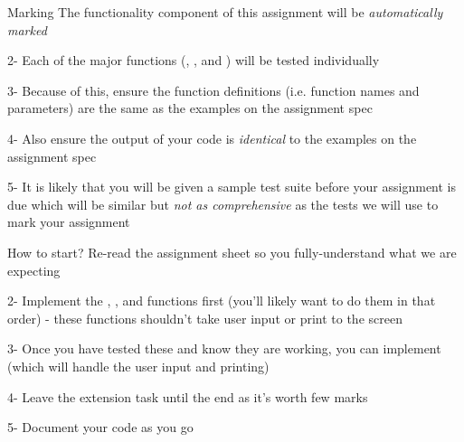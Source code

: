 \documentclass[week3]{csse1001}
\begin{document}
\begin{topic}{Marking}
The functionality component of this assignment will be \textit{automatically marked}

\begin{subtopic}{2-}
Each of the major functions (, ,  and ) will be tested individually
\end{subtopic}

\begin{subtopic}{3-}
Because of this, ensure the function definitions (i.e. function names and parameters) are the same as the examples on the assignment spec
\end{subtopic}

\begin{subtopic}{4-}
Also ensure the output of your code is \textit{identical} to the examples on the assignment spec
\end{subtopic}

\begin{subtopic}{5-}
It is likely that you will be given a sample test suite before your assignment is due which will be similar but \textit{not as comprehensive} as the tests we will use to mark your assignment
\end{subtopic}

\end{topic}

\begin{topic}{How to start?}
Re-read the assignment sheet so you fully-understand what we are expecting

\begin{subtopic}{2-}
Implement the , , and  functions first (you'll likely want to do them in that order) - these functions shouldn't take user input or print to the screen
\end{subtopic}

\begin{subtopic}{3-}
Once you have tested these and know they are working, you can implement  (which will handle the user input and printing)
\end{subtopic}

\begin{subtopic}{4-}
Leave the extension task until the end as it's worth few marks
\end{subtopic}

\begin{subtopic}{5-}
Document your code as you go
\end{subtopic}

\end{topic}
\end{document}
